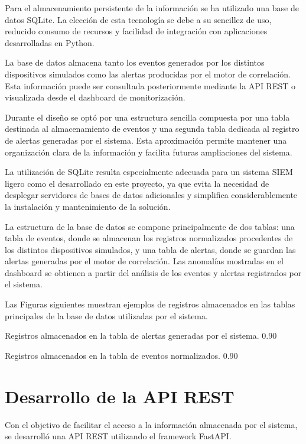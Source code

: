 Para el almacenamiento persistente de la información se ha utilizado una base de datos SQLite. La elección de esta tecnología se debe a su sencillez de uso, reducido consumo de recursos y facilidad de integración con aplicaciones desarrolladas en Python.

La base de datos almacena tanto los eventos generados por los distintos dispositivos simulados como las alertas producidas por el motor de correlación. Esta información puede ser consultada posteriormente mediante la API REST o visualizada desde el dashboard de monitorización.

Durante el diseño se optó por una estructura sencilla compuesta por una tabla destinada al almacenamiento de eventos y una segunda tabla dedicada al registro de alertas generadas por el sistema. Esta aproximación permite mantener una organización clara de la información y facilita futuras ampliaciones del sistema.

La utilización de SQLite resulta especialmente adecuada para un sistema SIEM ligero como el desarrollado en este proyecto, ya que evita la necesidad de desplegar servidores de bases de datos adicionales y simplifica considerablemente la instalación y mantenimiento de la solución.

La estructura de la base de datos se compone principalmente de dos tablas: una tabla de eventos, donde se almacenan los registros normalizados procedentes de los distintos dispositivos simulados, y una tabla de alertas, donde se guardan las alertas generadas por el motor de correlación. Las anomalías mostradas en el dashboard se obtienen a partir del análisis de los eventos y alertas registrados por el sistema.

Las Figuras siguientes muestran ejemplos de registros almacenados en las tablas principales de la base de datos utilizadas por el sistema.

{Registros almacenados en la tabla de alertas generadas por el sistema.}
{0.90}

{Registros almacenados en la tabla de eventos normalizados.}
{0.90}


\section{Desarrollo de la API REST}

Con el objetivo de facilitar el acceso a la información almacenada por el sistema, se desarrolló una API REST utilizando el framework FastAPI.

